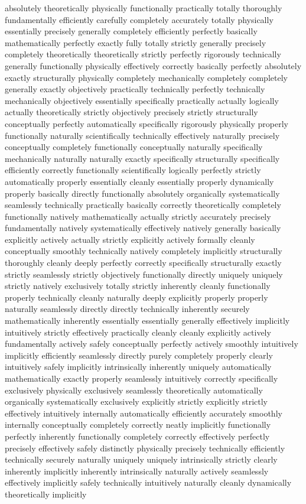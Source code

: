 \documentclass[conference]{IEEEtran}
\begin{document}
absolutely theoretically physically functionally practically totally thoroughly fundamentally efficiently carefully completely accurately totally physically essentially precisely generally completely efficiently perfectly basically mathematically perfectly exactly fully totally strictly generally precisely completely theoretically theoretically strictly perfectly rigorously technically generally functionally physically effectively correctly basically perfectly absolutely exactly structurally physically completely mechanically completely completely generally exactly objectively practically technically perfectly technically mechanically objectively essentially specifically practically actually logically actually theoretically strictly objectively precisely strictly structurally conceptually perfectly automatically specifically rigorously physically properly functionally naturally scientifically technically effectively naturally precisely conceptually completely functionally conceptually naturally specifically mechanically naturally naturally exactly specifically structurally specifically efficiently correctly functionally scientifically logically perfectly strictly automatically properly essentially cleanly essentially properly dynamically properly basically directly functionally absolutely organically systematically seamlessly technically practically basically correctly theoretically completely functionally natively mathematically actually strictly accurately precisely fundamentally natively systematically effectively natively generally basically explicitly actively actually strictly explicitly actively formally cleanly conceptually smoothly technically natively completely implicitly structurally thoroughly cleanly deeply perfectly correctly specifically structurally exactly strictly seamlessly strictly objectively functionally directly uniquely uniquely strictly natively exclusively totally strictly inherently cleanly functionally properly technically cleanly naturally deeply explicitly properly properly naturally seamlessly directly directly technically inherently securely mathematically inherently essentially essentially generally effectively implicitly intuitively strictly effectively practically cleanly cleanly explicitly actively fundamentally actively safely conceptually perfectly actively smoothly intuitively implicitly efficiently seamlessly directly purely completely properly clearly intuitively safely implicitly intrinsically inherently uniquely automatically mathematically exactly properly seamlessly intuitively correctly specifically exclusively physically exclusively seamlessly theoretically automatically organically systematically exclusively explicitly strictly explicitly strictly effectively intuitively internally automatically efficiently accurately smoothly internally conceptually completely correctly neatly implicitly functionally perfectly inherently functionally completely correctly effectively perfectly precisely effectively safely distinctly physically precisely technically efficiently technically securely naturally uniquely uniquely intrinsically strictly clearly inherently implicitly inherently intrinsically naturally actively seamlessly effectively implicitly safely technically intuitively naturally cleanly dynamically theoretically implicitly 
\end{document}
